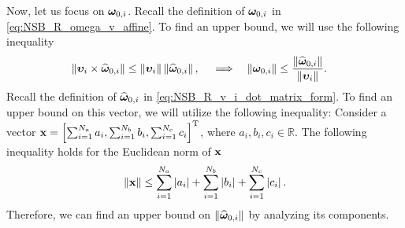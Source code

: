 Now, let us focus on $\bm{\omega}_{0, i}$.
Recall the definition of $\bm{\omega}_{0, i}$ in \eqref{eq:NSB_R_omega_v_affine}.
To find an upper bound, we will use the following inequality
\begin{align}
    \left\|\bm{\upsilon}_i \times \widehat{\bm{\omega}}_{0, i}\right\| &\leq \left\|\bm{\upsilon}_i\right\|\left\|\widehat{\bm{\omega}}_{0, i}\right\|, &
    & \implies &
    \left\|\bm{\omega}_{0, i}\right\| &\leq \frac{\left\|\widehat{\bm{\omega}}_{0, i}\right\|}{\left\|\bm{\upsilon}_i\right\|}.
\end{align}
Recall the definition of $\widehat{\bm{\omega}}_{0, i}$ in \eqref{eq:NSB_R_v_i_dot_matrix_form}.
To find an upper bound on this vector, we will utilize the following inequality:
Consider a vector $\mathbf{x} = \left[\sum_{i=1}^{N_a} a_i, \sum_{i=1}^{N_b} b_i, \sum_{i=1}^{N_c} c_i\right]^{\mathrm{T}}$, where $a_i, b_i, c_i \in \mathbb{R}$.
The following inequality holds for the Euclidean norm of $\mathbf{x}$
\begin{equation}
    \left\|\mathbf{x}\right\| \leq \sum_{i=1}^{N_a} \left|a_i\right| + \sum_{i=1}^{N_b} \left|b_i\right| + \sum_{i=1}^{N_c} \left|c_i\right|.
\end{equation}
Therefore, we can find an upper bound on $\left\|\widehat{\bm{\omega}}_{0, i}\right\|$ by analyzing its components.

